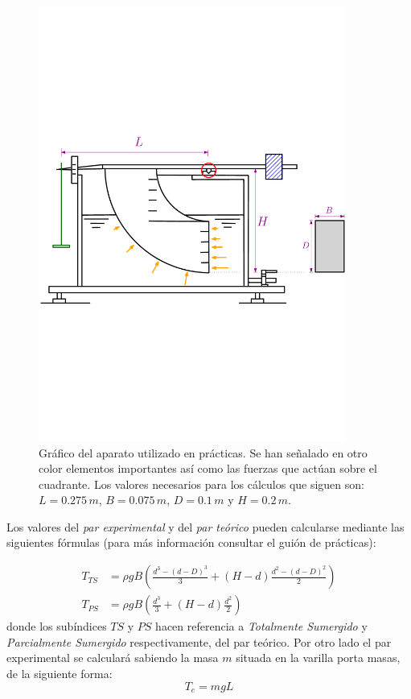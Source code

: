 \documentclass[12pt,a4paper]{article}
\begin{document}
\begin{figure}[H]
\vspace{-0.2cm}
 	 \begin{center}
  \includegraphics[width=0.9\textwidth]{fotos/esquema_2}
  	 \end{center}
  	\caption{Gráfico del aparato utilizado en prácticas. Se han señalado en otro color elementos importantes así como las fuerzas que actúan sobre el cuadrante. Los valores necesarios para los cálculos que siguen son: $L=0.275\,m$, $B=0.075\,m$, $D=0.1\,m$ y $H=0.2\,m$.}
  	\label{fig4}
  	\vspace{-0.2cm}
\end{figure}

Los valores del \emph{par experimental} y del \emph{par teórico} pueden calcularse mediante las siguientes fórmulas (para más información consultar el guión de prácticas):

\begin{align*}
T_{TS}&= \rho g B \left( \frac{d^{3}-(d-D)^{3}}{3} + (H-d)\frac{d^{2}-(d-D)^{2}}{2}\right)\\
T_{PS} &= \rho g B \left( \frac{d^{3}}{3} + (H-d) \frac{d^{2}}{2}\right)
\end{align*}
donde los subíndices $TS$ y $PS$ hacen referencia a \emph{Totalmente Sumergido} y \emph{Parcialmente Sumergido} respectivamente, del par teórico.
Por otro lado el par experimental se calculará sabiendo la masa $m$ situada en la varilla porta masas, de la siguiente forma: $$ \boxed{T_{e}=m g L}$$
\end{document}
